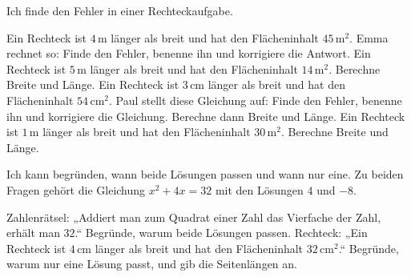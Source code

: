 \begin{aufgabe}{Ich finde den Fehler in einer Rechteckaufgabe.}
\begin{teile}
\teil Ein Rechteck ist $4\,$m länger als breit und hat den Flächeninhalt $45\,\text{m}^2$. Emma rechnet so:
Finde den Fehler, benenne ihn und korrigiere die Antwort.
\teil Ein Rechteck ist $5\,$m länger als breit und hat den Flächeninhalt $14\,\text{m}^2$. Berechne Breite und Länge.
\teil Ein Rechteck ist $3\,$cm länger als breit und hat den Flächeninhalt $54\,\text{cm}^2$. Paul stellt diese Gleichung auf:
Finde den Fehler, benenne ihn und korrigiere die Gleichung. Berechne dann Breite und Länge.
\teil Ein Rechteck ist $1\,$m länger als breit und hat den Flächeninhalt $30\,\text{m}^2$. Berechne Breite und Länge.
\end{teile}
\end{aufgabe}

\begin{aufgabe}{Ich kann begründen, wann beide Lösungen passen und wann nur eine. Zu beiden Fragen gehört die Gleichung $x^2 + 4x = 32$ mit den Lösungen $4$ und $-8$.}
\begin{teile}
\teil Zahlenrätsel: „Addiert man zum Quadrat einer Zahl das Vierfache der Zahl, erhält man $32$.“ Begründe, warum beide Lösungen passen.
\teil Rechteck: „Ein Rechteck ist $4\,$cm länger als breit und hat den Flächeninhalt $32\,\text{cm}^2$.“ Begründe, warum nur eine Lösung passt, und gib die Seitenlängen an.
\end{teile}
\end{aufgabe}
